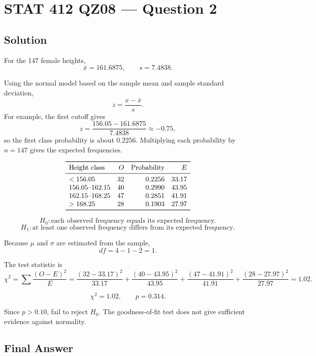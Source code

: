 \documentclass[11pt]{article}
\begin{document}
\section*{STAT 412 QZ08 --- Question 2}

\subsection*{Solution}

For the 147 female heights,
\[
\bar{x}=161.6875,\qquad s=7.4838.
\]

Using the normal model based on the sample mean and sample standard deviation,
\[
z=\frac{x-\bar{x}}{s}.
\]
For example, the first cutoff gives
\[
z=\frac{156.05-161.6875}{7.4838}\approx -0.75,
\]
so the first class probability is about \(0.2256\). Multiplying each probability by \(n=147\) gives the expected frequencies.

\[
\begin{array}{lrrr}
\toprule
\text{Height class} & O & \text{Probability} & E\\
\midrule
<156.05 & 32 & 0.2256 & 33.17\\
156.05\text{--}162.15 & 40 & 0.2990 & 43.95\\
162.15\text{--}168.25 & 47 & 0.2851 & 41.91\\
>168.25 & 28 & 0.1903 & 27.97\\
\bottomrule
\end{array}
\]

\[
H_0:\text{each observed frequency equals its expected frequency.}
\]
\[
H_1:\text{at least one observed frequency differs from its expected frequency.}
\]

Because \(\mu\) and \(\sigma\) are estimated from the sample,
\[
df=4-1-2=1.
\]

The test statistic is
\[
\chi^2=\sum\frac{(O-E)^2}{E}
=\frac{(32-33.17)^2}{33.17}
+\frac{(40-43.95)^2}{43.95}
+\frac{(47-41.91)^2}{41.91}
+\frac{(28-27.97)^2}{27.97}
=1.02.
\]

\[
\chi^2=1.02,\qquad p=0.314.
\]

Since \(p>0.10\), fail to reject \(H_0\). The goodness-of-fit test does not give sufficient evidence against normality.

\subsection*{Final Answer}

\end{document}
